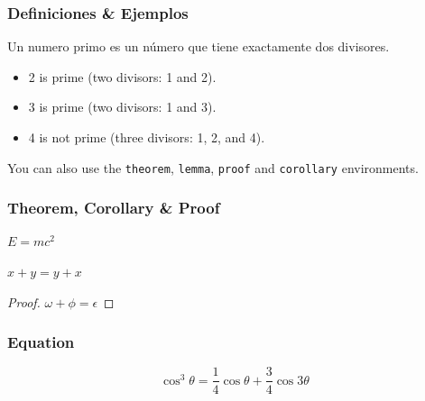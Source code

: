 \documentclass[
	11pt, %
	aspectratio=169, %
]{beamer}
\begin{document}
\begin{frame}
	\frametitle{Definiciones \& Ejemplos}
	
	\begin{definition}
		Un \alert{numero primo} es un número que tiene exactamente dos divisores.
	\end{definition}

	\smallskip %
	
	\begin{example}
		\begin{itemize}
			\item 2 is prime (two divisors: 1 and 2).
			\item 3 is prime (two divisors: 1 and 3).
			\item 4 is not prime (\alert{three} divisors: 1, 2, and 4).
		\end{itemize}
	\end{example}
	
	\smallskip %
	
	You can also use the \texttt{theorem}, \texttt{lemma}, \texttt{proof} and \texttt{corollary} environments.
\end{frame}


\begin{frame}
	\frametitle{Theorem, Corollary \& Proof}
	
	\begin{theorem}
		$E = mc^2$
	\end{theorem}
	
	\begin{corollary}
		$x + y = y + x$
	\end{corollary}
	
	\begin{proof}
		$\omega + \phi = \epsilon$
	\end{proof}
\end{frame}


\begin{frame}
	\frametitle{Equation}

	\begin{equation}
		\cos^3 \theta =\frac{1}{4}\cos\theta+\frac{3}{4}\cos 3\theta
	\end{equation}
\end{frame}

\end{document}
